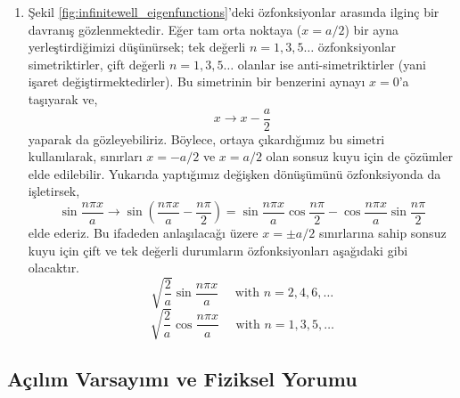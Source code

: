 \documentclass[a4paper,12pt, twoside]{article}
\begin{document}
\begin{enumerate}
	
	\item Şekil \ref{fig:infinitewell_eigenfunctions}'deki özfonksiyonlar arasında ilginç bir davranış gözlenmektedir. Eğer tam orta noktaya ($x=a/2$) bir ayna yerleştirdiğimizi düşünürsek; tek değerli $n=1, 3, 5 \ldots$ özfonksiyonlar simetriktirler, çift değerli $n=1, 3, 5 \ldots$ olanlar ise anti-simetriktirler (yani işaret değiştirmektedirler). Bu simetrinin bir benzerini aynayı $x=0$'a taşıyarak ve, 
	\begin{equation*}
	x \rightarrow x - \frac { a } { 2 }
	\end{equation*}
	yaparak da gözleyebiliriz. Böylece, ortaya çıkardığımız bu simetri kullanılarak, sınırları $x=-a/2$ ve $x=a/2$ olan sonsuz kuyu için de çözümler elde edilebilir. Yukarıda yaptığımız değişken dönüşümünü özfonksiyonda da işletirsek,
	\begin{equation}
	\sin \frac { n \pi x } { a } \rightarrow \sin \left( \frac { n \pi x } { a } - \frac { n \pi } { 2 } \right) = \sin \frac { n \pi x } { a } \cos \frac { n \pi } { 2 } - \cos \frac { n \pi x } { a } \sin \frac { n \pi } { 2 }
	\end{equation}
	elde ederiz. Bu ifadeden anlaşılacağı üzere $x=\pm a/2$ sınırlarına sahip sonsuz kuyu için çift ve tek değerli durumların özfonksiyonları aşağıdaki gibi olacaktır.
	\begin{equation}
	\sqrt { \frac { 2 } { a } } \sin \frac { n \pi x } { a } \quad \text { with } n = 2,4,6, \dots
	\end{equation}
	\begin{equation}
	\sqrt { \frac { 2 } { a } } \cos \frac { n \pi x } { a } \quad \text { with } n = 1,3,5 , \dots
	\end{equation}
	
\end{enumerate}



\subsection{Açılım Varsayımı ve Fiziksel Yorumu }
\end{document}

